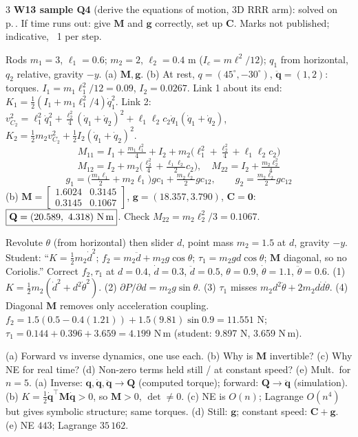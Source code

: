 \begin{multicols}{3}
\textbf{W13 sample Q4} (derive the equations of motion, 3D RRR arm): solved on p.\,\pageref{p:SAMPLE}. If time runs out: give $\mathbf M$ and $\mathbf g$ correctly, set up $\mathbf C$. Marks not published; indicative, ~1 per step.
\begin{examq}
Rods $m_1=3$, $\ell_1=0.6$; $m_2=2$, $\ell_2=0.4$ m ($I_c=m\ell^2/12$); $q_1$ from horizontal, $q_2$ relative, gravity $-y$. (a) $\mathbf M,\mathbf g$. (b) At rest, $q=(45^\circ,-30^\circ)$, $\ddot{\mathbf q}=(1,2)$: torques.
\solution
$I_1=m_1\ell_1^2/12=0.09$, $I_2=0.0267$. Link 1 about its end: $K_1=\tfrac12(I_1+m_1\ell_1^2/4)\dot q_1^2$. Link 2: $v_{C_2}^2=\ell_1^2\dot q_1^2+\tfrac{\ell_2^2}4(\dot q_1{+}\dot q_2)^2+\ell_1\ell_2c_2\dot q_1(\dot q_1{+}\dot q_2)$, $K_2=\tfrac12m_2v_{C_2}^2+\tfrac12I_2(\dot q_1{+}\dot q_2)^2$.
\[M_{11}=I_1{+}\tfrac{m_1\ell_1^2}4{+}I_2{+}m_2\big(\ell_1^2{+}\tfrac{\ell_2^2}4{+}\ell_1\ell_2c_2\big)\]
\[M_{12}=I_2{+}m_2\big(\tfrac{\ell_2^2}4{+}\tfrac{\ell_1\ell_2}2c_2\big),\quad M_{22}=I_2{+}\tfrac{m_2\ell_2^2}4\]
\[g_1=\big(\tfrac{m_1\ell_1}2+m_2\ell_1\big)gc_1+\tfrac{m_2\ell_2}2gc_{12},\qquad g_2=\tfrac{m_2\ell_2}2gc_{12}\]
(b) $\mathbf M=\begin{bmatrix}1.6024&0.3145\\0.3145&0.1067\end{bmatrix}$, $\mathbf g=(18.357,3.790)$, $\mathbf C=\mathbf 0$: $\boxed{\mathbf Q=(20.589,\ 4.318)\text{ N\,m}}$. Check $M_{22}=m_2\ell_2^2/3=0.1067$. \chk
\end{examq}
\begin{examq}
Revolute $\theta$ (from horizontal) then slider $d$, point mass $m_2=1.5$ at $d$, gravity $-y$. Student: ``$K=\tfrac12m_2\dot d^2$; $f_2=m_2\ddot d+m_2g\cos\theta$; $\tau_1=m_2gd\cos\theta$; $\mathbf M$ diagonal, so no Coriolis.'' Correct $f_2,\tau_1$ at $d=0.4$, $\dot d=0.3$, $\ddot d=0.5$, $\theta=0.9$, $\dot\theta=1.1$, $\ddot\theta=0.6$.
\solution
(1) $K=\tfrac12m_2(\dot d^2+d^2\dot\theta^2)$. (2) $\partial P/\partial d=m_2g\sin\theta$. (3) $\tau_1$ misses $m_2d^2\ddot\theta+2m_2d\dot d\dot\theta$. (4) Diagonal $\mathbf M$ removes only acceleration coupling.\\
$f_2=1.5(0.5-0.4(1.21))+1.5(9.81)\sin0.9=\boxed{11.551}$ N; $\tau_1=0.144+0.396+3.659=\boxed{4.199}$ N\,m (student: 9.897 N, 3.659 N\,m). \chk
\end{examq}
\begin{examq}
(a) Forward vs inverse dynamics, one use each. (b) Why is $\mathbf M$ invertible? (c) Why NE for real time? (d) Non-zero terms held still / at constant speed? (e) Mult.\ for $n=5$.
\solution
(a) Inverse: $\mathbf q,\dot{\mathbf q},\ddot{\mathbf q}\to\mathbf Q$ (computed torque); forward: $\mathbf Q\to\ddot{\mathbf q}$ (simulation). (b) $K=\tfrac12\dot{\mathbf q}^\top\mathbf M\dot{\mathbf q}>0$, so $\mathbf M>0$, $\det\ne0$. (c) NE is $O(n)$; Lagrange $O(n^4)$ but gives symbolic structure; same torques. (d) Still: $\mathbf g$; constant speed: $\mathbf C+\mathbf g$. (e) NE $443$; Lagrange $35\,162$. \chk
\end{examq}
\end{multicols}

